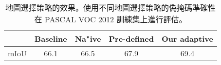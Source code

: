 \begin{table}[]
\centering

{\small
\begin{tabular}{@{}ccccc@{}}
\toprule
                            & Baseline  & Na"ive   & Pre-defined   & Our adaptive \\ \midrule
\multicolumn{1}{l}{mIoU}    &66.1       & 66.5      & 67.9          & 69.4   \\ \bottomrule
\end{tabular}
}
\vspace{2mm}
\caption{地圖選擇策略的效果。使用不同地圖選擇策略的偽掩碼準確性在 PASCAL VOC 2012 訓練集上進行評估。} \vspace{-2mm}
\label{tab:strategy}
\end{table}
